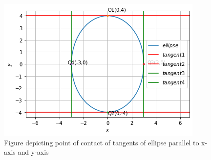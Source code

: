 \documentclass[journal,12pt,twocolumn]{IEEEtran}
\begin{document}
 \begin{figure}[h!]
 \renewcommand \thefigure{1}
	\centering
	\includegraphics[width=\columnwidth]{ellipse.png}
	\caption{Figure depicting point of contact of tangents of ellipse parallel to x-axis and y-axis}
	\label{fig1}
\end{figure}
 
\end{document}
